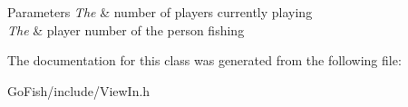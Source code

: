 \begin{DoxyParams}{Parameters}
{\em The} & number of players currently playing \\
\hline
{\em The} & player number of the person fishing \\
\hline
\end{DoxyParams}


The documentation for this class was generated from the following file\-:\begin{DoxyCompactItemize}
\item 
Go\-Fish/include/View\-In.\-h\end{DoxyCompactItemize}
